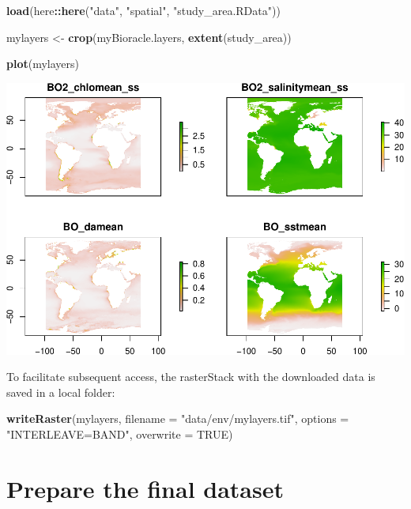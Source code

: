 \documentclass[
]{book}
\newenvironment{Shaded}{\begin{snugshade}}{\end{snugshade}}
\newcommand{\AttributeTok}[1]{\textcolor[rgb]{0.13,0.29,0.53}{#1}}
\newcommand{\ConstantTok}[1]{\textcolor[rgb]{0.56,0.35,0.01}{#1}}
\newcommand{\FunctionTok}[1]{\textcolor[rgb]{0.13,0.29,0.53}{\textbf{#1}}}
\newcommand{\NormalTok}[1]{#1}
\newcommand{\OtherTok}[1]{\textcolor[rgb]{0.56,0.35,0.01}{#1}}
\newcommand{\SpecialCharTok}[1]{\textcolor[rgb]{0.81,0.36,0.00}{\textbf{#1}}}
\newcommand{\StringTok}[1]{\textcolor[rgb]{0.31,0.60,0.02}{#1}}
\begin{document}
\begin{Shaded}
\begin{Highlighting}[]
\FunctionTok{load}\NormalTok{(here}\SpecialCharTok{::}\FunctionTok{here}\NormalTok{(}\StringTok{"data"}\NormalTok{, }\StringTok{"spatial"}\NormalTok{, }\StringTok{"study\_area.RData"}\NormalTok{))}

\NormalTok{mylayers }\OtherTok{\textless{}{-}} \FunctionTok{crop}\NormalTok{(myBioracle.layers, }\FunctionTok{extent}\NormalTok{(study\_area))}

\FunctionTok{plot}\NormalTok{(mylayers)}
\end{Highlighting}
\end{Shaded}

\includegraphics{_main_files/figure-latex/unnamed-chunk-37-1.pdf}

To facilitate subsequent access, the rasterStack with the downloaded data is saved in a local folder:

\begin{Shaded}
\begin{Highlighting}[]
\FunctionTok{writeRaster}\NormalTok{(mylayers, }\AttributeTok{filename =} \StringTok{"data/env/mylayers.tif"}\NormalTok{,}
    \AttributeTok{options =} \StringTok{"INTERLEAVE=BAND"}\NormalTok{, }\AttributeTok{overwrite =} \ConstantTok{TRUE}\NormalTok{)}
\end{Highlighting}
\end{Shaded}

\chapter{Prepare the final dataset}\label{prepare-the-final-dataset}
\end{document}
